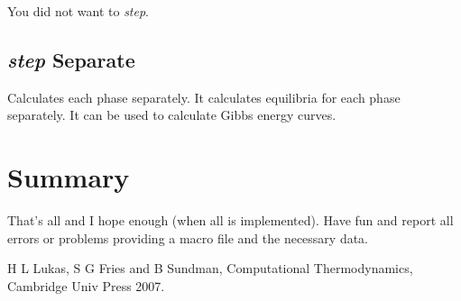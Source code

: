 \documentclass[12pt]{article}
\begin{document}
You did not want to {\em step}.

\subsection{{\em step} Separate}

Calculates each phase separately.  It calculates equilibria for each
phase separately.  It can be used to calculate Gibbs energy curves.


\section{Summary }

That's all and I hope enough (when all is implemented).  Have fun and
report all errors or problems providing a macro file and the necessary
data.

\begin{thebibliography}{77zzz}
 H L Lukas, S G Fries and B Sundman, Computational
Thermodynamics, Cambridge Univ Press 2007.
\end{thebibliography}
\end{document}
